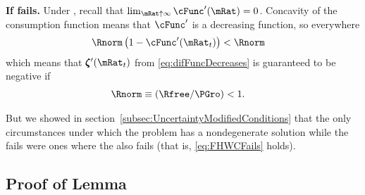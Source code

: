 \documentclass[\econtexRoot/BufferStockTheory]{subfiles}
\begin{document}
\textbf{If {\RIC} fails.}
Under \cncl{\RIC}, recall that $\lim_{\mRat \uparrow \infty} \cFunc^{\prime}(\mRat) = 0$.  Concavity of the consumption function means that $\cFunc^{\prime}$ is a decreasing function, so everywhere 
\begin{align*}
  \Rnorm\left(1-\cFunc^{\prime}({\mRat}_t)\right) & < \Rnorm
\end{align*}
which means that $\difFunc^{\prime}(\mRat_{t})$ from \eqref{eq:difFuncDecreases} is guaranteed to be negative if
\begin{equation}\begin{gathered}\begin{aligned}
  \Rnorm \equiv (\Rfree/\PGro) & < 1  \label{eq:FHWCFails}.
\end{aligned}\end{gathered}\end{equation}

But we showed in section~\ref{subsec:UncertaintyModifiedConditions} that the only circumstances under which the problem has a nondegenerate solution while the {\RIC} fails were ones where the {\FHWC} also fails (that is, \eqref{eq:FHWCFails} holds).

\subsection{Proof of Lemma}

\begin{comment}
\subsection{Comment}


Due to the model's nonlinearities the values of $\mRat$ at which the expected growth rate of $\cLevBF$ matches $\PGro$ is very slightly different from the $\mRat$ at which the growth rate at which expected growth of $\mLevBF$ is $\PGro$.  Defining $\grave{\mRat}$ as the $\mRat$ at which $\Ex_{t}[\cRatBF_{t+1}/\cRatBF_{t}]=\PGro$, we can show that to first order $\grave{\mRat} \approx \check{\mRat}.$
\begin{align*}
  \Ex_{t}[\cFunc(\mRat_{t+1})\pShk_{t+1}] & = \cFunc(\mRat_{t}) \label{eq:balgrostableC}.
  \\ \Ex_{t}[\left(\cFunc(\grave{\mRat})+\cFunc^{\prime}(\grave{\mRat})(\mRat_{t+1}-\grave{\mRat})\right)\pShk_{t+1}] & \approx \cFunc(\grave{\mRat})
  \\ \Ex_{t}[\left(\cFunc^{\prime}(\grave{\mRat})(\mRat_{t+1}-\grave{\mRat})\right)\pShk_{t+1}] & \approx 0
  \\ \Ex_{t}[\mRat_{t+1}] & \approx \grave{\mRat} 
\end{align*}
but at $\mRat=\check{\mRat}$, $\Ex_{t}[\mRat_{t+1}]=\check{\mRat}\approx\grave{\mRat}$.
\end{comment}
\end{document}
